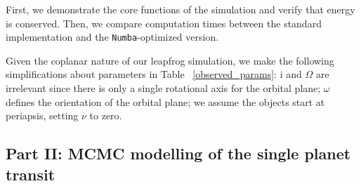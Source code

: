 \documentclass[linenumbers]{aastex631}
\begin{document}
First, we demonstrate the core functions of the simulation and verify that energy is conserved. Then, we compare computation times between the standard implementation and the {\tt\string Numba}-optimized version.

Given the coplanar nature of our leapfrog simulation, we make the following simplifications about parameters in Table ~\ref{observed_params}: i and $\Omega$ are irrelevant since there is only a single rotational axis for the orbital plane; $\omega$ defines the orientation of the orbital plane; we assume the objects start at periapsis, setting $\nu$ to zero.
\subsection{Part II: MCMC modelling of the single planet transit}
\end{document}
